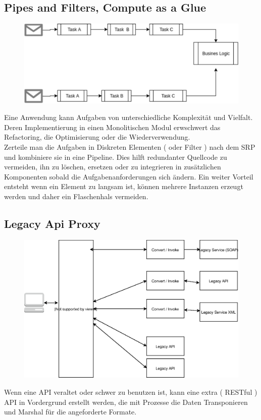 \documentclass[
12pt,
english,
ngerman,
headsepline,
twoside,
openright,
numbers=noenddot,version=first
]{scrreprt}
\begin{document}
\subsection{Pipes and Filters, Compute as a Glue}
\label{sec:pipes-filters}
\begin{figure}
	\includegraphics[width=0.9\linewidth]{./pics/pipes-and-filters.eps}
\end{figure}
Eine Anwendung kann Aufgaben von unterschiedliche Komplexität und Vielfalt. Deren Implementierung in einen Monolitischen Modul erwschwert das Refactoring, die Optimisierung oder die Wiederverwendung. \\
Zerteile man die Aufgaben in Diskreten Elementen ( oder Filter ) nach dem \acrshort{SRP} und kombiniere sie in eine Pipeline. Dies hilft redundanter Quellcode zu vermeiden, ihn zu löschen, ersetzen oder zu integrieren in zusätzlichen Komponenten sobald die Aufgabenanforderungen sich ändern\cite{patternsCloud}. Ein weiter Vorteil entsteht wenn ein Element zu langsam ist, können mehrere Instanzen erzeugt werden und daher ein Flaschenhals vermeiden.



\subsection{Legacy Api Proxy}
\begin{figure}
	\includegraphics[width=0.9\linewidth]{./pics/legacy-api-proxy.eps}
\end{figure}
Wenn eine \acrshort{API} veraltet oder schwer zu benutzen ist, kann eine extra ( RESTful ) \acrshort{API} in Vordergrund erstellt werden, die  mit Prozesse die Daten Transponieren und Marshal für die angeforderte Formate.
\\
\\
\end{document}
